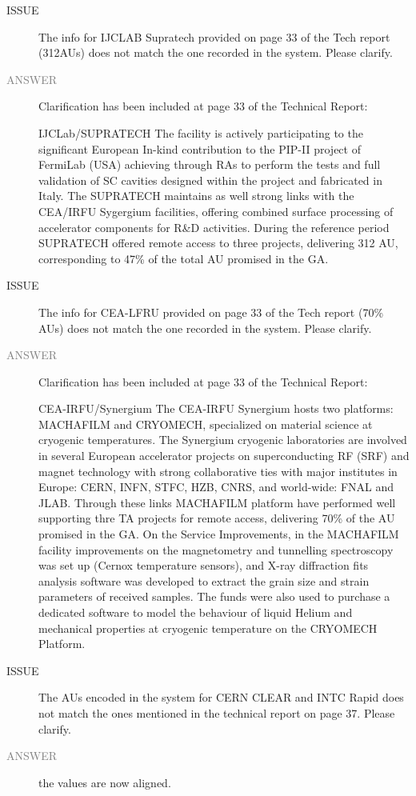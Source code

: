 \begin{prtwo}
\begin{description}
\item[ISSUE] The info for IJCLAB Supratech provided on page 33 of the Tech report (312AUs) does not match the one recorded in the system. Please clarify.
\item[\textcolor{gray}{ANSWER}] Clarification has been included at page 33 of the Technical Report: 

IJCLab/SUPRATECH The facility is actively participating to the significant European In-kind contribution to the PIP-II project of FermiLab (USA) achieving through RAs to perform the tests and full validation of SC cavities designed within the project and fabricated in Italy. The SUPRATECH maintains as well strong links with the CEA/IRFU Sygergium facilities, offering combined surface processing of accelerator components for R\&D activities. During the reference period SUPRATECH offered remote access to three projects, delivering 312 AU, corresponding to 47\% of the total AU promised in the GA. 

\item[ISSUE] The info for CEA-LFRU provided on page 33 of the Tech report (70\% AUs) does not match the one recorded in the system. Please clarify.
\item[\textcolor{gray}{ANSWER}] Clarification has been included at page 33 of the Technical Report:

CEA-IRFU/Synergium The CEA-IRFU Synergium hosts two platforms: MACHAFILM and CRYOMECH, specialized on material science at cryogenic temperatures. The Synergium cryogenic laboratories are involved in several European accelerator projects on  superconducting RF (SRF) and magnet technology with strong collaborative ties with major institutes in Europe: CERN, INFN, STFC, HZB, CNRS, and world-wide: FNAL and JLAB. Through these links MACHAFILM platform have performed well supporting thre TA projects for remote access, delivering 70\% of the AU promised in the GA. 
On the Service Improvements, in the MACHAFILM facility improvements on the magnetometry and
tunnelling spectroscopy was set up (Cernox temperature sensors), and X-ray diffraction fits analysis software was developed to extract the grain size and strain parameters of received samples. The funds were also used to purchase a dedicated software to model the behaviour of liquid Helium and mechanical properties at cryogenic temperature on the CRYOMECH Platform.

\item[ISSUE] The AUs encoded in the system for CERN CLEAR and INTC Rapid does not match the ones mentioned in the technical report on page 37. Please clarify.
\item[\textcolor{gray}{ANSWER}] the values are now aligned.


\end{description}
\end{prtwo}
